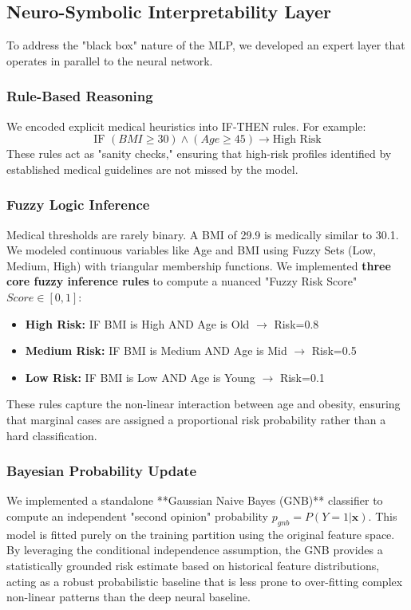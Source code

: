 \documentclass[conference]{IEEEtran}
\newcommand{\bx}{\mathbf{x}}
\begin{document}
\subsection{Neuro-Symbolic Interpretability Layer}
 To address the "black box" nature of the MLP, we developed an expert layer that operates in parallel to the neural network.

\subsubsection{Rule-Based Reasoning}
 We encoded explicit medical heuristics into IF-THEN rules. For example:
\begin{equation}
    \text{IF } (BMI \ge 30) \land (Age \ge 45) \rightarrow \text{High Risk}
\end{equation}
These rules act as "sanity checks," ensuring that high-risk profiles identified by established medical guidelines are not missed by the model.

\subsubsection{Fuzzy Logic Inference}
 Medical thresholds are rarely binary. A BMI of 29.9 is medically similar to 30.1. We modeled continuous variables like Age and BMI using Fuzzy Sets (Low, Medium, High) with triangular membership functions. We implemented \textbf{three core fuzzy inference rules} to compute a nuanced "Fuzzy Risk Score" $Score \in [0, 1]$:
\begin{itemize}
    \item \textbf{High Risk:} IF BMI is High AND Age is Old $\rightarrow$ Risk=0.8
    \item \textbf{Medium Risk:} IF BMI is Medium AND Age is Mid $\rightarrow$ Risk=0.5
    \item \textbf{Low Risk:} IF BMI is Low AND Age is Young $\rightarrow$ Risk=0.1
\end{itemize}
These rules capture the non-linear interaction between age and obesity, ensuring that marginal cases are assigned a proportional risk probability rather than a hard classification.

\subsubsection{Bayesian Probability Update}
 We implemented a standalone **Gaussian Naive Bayes (GNB)** classifier to compute an independent "second opinion" probability $p_{gnb} = P(Y=1 | \bx)$. This model is fitted purely on the training partition using the original feature space. By leveraging the conditional independence assumption, the GNB provides a statistically grounded risk estimate based on historical feature distributions, acting as a robust probabilistic baseline that is less prone to over-fitting complex non-linear patterns than the deep neural baseline.
\end{document}

